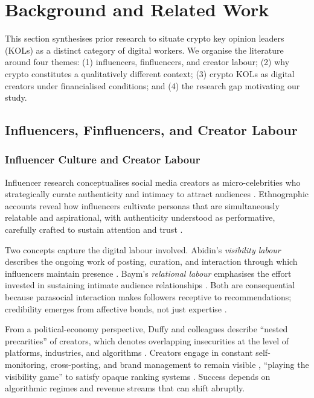 
\section{Background and Related Work}\label{sec:background}

This section synthesises prior research to situate crypto key opinion leaders (KOLs) as a distinct category of digital workers. We organise the literature around four themes: (1) influencers, finfluencers, and creator labour; (2) why crypto constitutes a qualitatively different context; (3) crypto KOLs as digital creators under financialised conditions; and (4) the research gap motivating our study.

\subsection{Influencers, Finfluencers, and Creator Labour}

\subsubsection{Influencer Culture and Creator Labour}

Influencer research conceptualises social media creators as micro-celebrities who strategically curate authenticity and intimacy to attract audiences \cite{MarwickStatusUpdate2013,Khamis2017,Enke2019}. Ethnographic accounts reveal how influencers cultivate personas that are simultaneously relatable and aspirational, with authenticity understood as performative, carefully crafted to sustain attention and trust \cite{MarwickStatusUpdate2013,BaymPlaying2018}.

Two concepts capture the digital labour involved. Abidin's \emph{visibility labour} describes the ongoing work of posting, curation, and interaction through which influencers maintain presence \cite{AbidinVisibility2016}. Baym's \emph{relational labour} emphasises the effort invested in sustaining intimate audience relationships \cite{BaymPlaying2018}. Both are consequential because parasocial interaction makes followers receptive to recommendations; credibility emerges from affective bonds, not just expertise \cite{Lou2019,Labrecque2014,Reinikainen2020}.

From a political-economy perspective, Duffy and colleagues describe  ``nested precarities'' of creators, which denotes overlapping insecurities at the level of platforms, industries, and algorithms \cite{DuffyPlatformPractices2019,DuffyNestedPrecarities2021}. Creators engage in constant self-monitoring, cross-posting, and brand management to remain visible \cite{DuffyAspirationalWork2017}, ``playing the visibility game'' to satisfy opaque ranking systems \cite{CotterVisibilityGame2019}. Success depends on algorithmic regimes and revenue streams that can shift abruptly.

